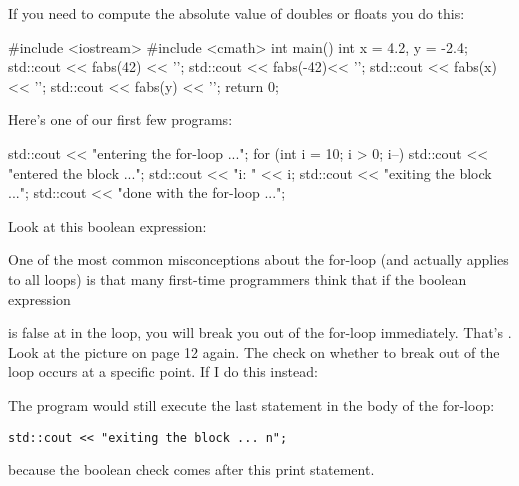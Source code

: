 If you need to compute the absolute value of doubles or floats you do
this:
\begin{console}
#include <iostream>
#include <cmath>
int main()
{   
    int x = 4.2, y = -2.4;
    std::cout << fabs(42) << '\n';
    std::cout << fabs(-42)<< '\n'; 
    std::cout << fabs(x) << '\n'; 
    std::cout << fabs(y) << '\n';
}
return 0;
\end{console}


\newpage{}

Here's one of our first few programs:
\begin{console}
std::cout << "entering the for-loop ...\n";
for (int i = 10; i > 0; i--)
{   
    std::cout << "entered the block ...\n";
    std::cout << "i: " << i;
    std::cout << "exiting the block ...\n";
}
std::cout << "done with the for-loop ...\n";
\end{console}

Look at this boolean expression:
One of the most common misconceptions about the for-loop (and actually
applies to all loops) is that many first-time programmers think that if
the boolean expression
\begin{center}
\end{center}
is false at  in the loop, you will break you out of
the for-loop immediately. That's . Look
at the picture on page 12 again. The check on whether to break out of
the loop occurs at a specific point. If I do this instead:


The program would still execute the last statement in the body of the
for-loop:
\begin{center}
\texttt{std::cout << "exiting the block ...\ n";}
\end{center}
because the boolean check comes after this print statement.
\begin{center}
\end{center}

